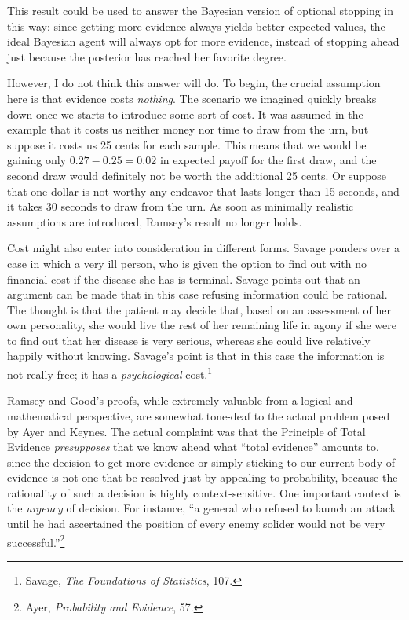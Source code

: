 This result could be used to answer the Bayesian version of optional
stopping in this way: since getting more evidence always yields better
expected values, the ideal Bayesian agent will always opt for more
evidence, instead of stopping ahead just because the posterior has
reached her favorite degree.

However, I do not think this answer will do. To begin, the crucial
assumption here is that evidence costs \emph{nothing}. The scenario we
imagined quickly breaks down once we starts to introduce some sort of
cost. It was assumed in the example that it costs us neither money nor
time to draw from the urn, but suppose it costs us 25 cents for each
sample. This means that we would be gaining only \(0.27-0.25 = 0.02\) in
expected payoff for the first draw, and the second draw would definitely
not be worth the additional 25 cents. Or suppose that one dollar is not
worthy any endeavor that lasts longer than 15 seconds, and it takes 30
seconds to draw from the urn. As soon as minimally realistic assumptions
are introduced, Ramsey's result no longer holds.

Cost might also enter into consideration in different forms. Savage
ponders over a case in which a very ill person, who is given the option
to find out with no financial cost if the disease she has is terminal.
Savage points out that an argument can be made that in this case
refusing information could be rational. The thought is that the patient
may decide that, based on an assessment of her own personality, she
would live the rest of her remaining life in agony if she were to find
out that her disease is very serious, whereas she could live relatively
happily without knowing. Savage's point is that in this case the
information is not really free; it has a \emph{psychological}
cost.\footnote{Savage, \emph{The Foundations of Statistics}, 107.}

Ramsey and Good's proofs, while extremely valuable from a logical and
mathematical perspective, are somewhat tone-deaf to the actual problem
posed by Ayer and Keynes. The actual complaint was that the Principle of
Total Evidence \emph{presupposes} that we know ahead what ``total
evidence'' amounts to, since the decision to get more evidence or simply
sticking to our current body of evidence is not one that be resolved
just by appealing to probability, because the rationality of such a
decision is highly context-sensitive. One important context is the
\emph{urgency} of decision. For instance, ``a general who refused to
launch an attack until he had ascertained the position of every enemy
solider would not be very successful.''\footnote{Ayer, \emph{Probability
  and Evidence}, 57.}


